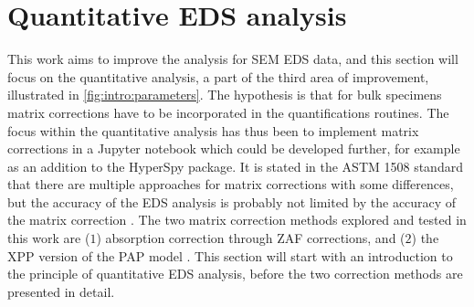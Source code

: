 






\clearpage




























\section{Quantitative EDS analysis}
\label{theory:quantitative}

This work aims to improve the analysis for SEM EDS data, and this section will focus on the quantitative analysis, a part of the third area of improvement, illustrated in \cref{fig:intro:parameters}.
The hypothesis is that for bulk specimens matrix corrections have to be incorporated in the quantifications routines.
The focus within the quantitative analysis has thus been to implement matrix corrections in a Jupyter notebook which could be developed further, for example as an addition to the HyperSpy package.
It is stated in the ASTM 1508 standard \cite{astm_e1508_eds_quantification} that there are multiple approaches for matrix corrections with some differences, but the accuracy of the EDS analysis is probably not limited by the accuracy of the matrix correction \cite{astm_e1508_eds_quantification}.
The two matrix correction methods explored and tested in this work are ($1$) absorption correction through ZAF corrections, and ($2$) the XPP version of the PAP model \cite{pap_1991}.
This section will start with an introduction to the principle of quantitative EDS analysis, before the two correction methods are presented in detail.






